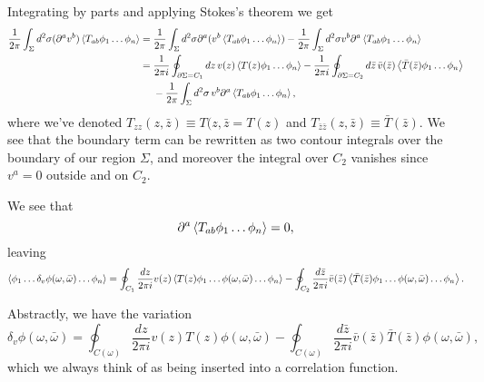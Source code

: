 Integrating by parts and applying Stokes's theorem we get
\begin{align*}
    \frac{1}{2\pi} \int_\Sigma d^2\sigma (\partial^a v^b)\left< T_{ab} \phi_1 \ldots \phi_n \right>
        ={}&\frac{1}{2\pi} \int_\Sigma d^2\sigma \partial^a(v^b \left< T_{ab} \phi_1\ldots \phi_n \right>)-\frac{1}{2\pi}\int_\Sigma d^2\sigma v^b \partial^a \left< T_{ab} \phi_1 \ldots \phi_n \right>\\
        ={}& \frac{1}{2\pi i} \oint_{\partial \Sigma=C_1} dz\, v(z) \left< T(z) \phi_1\ldots \phi_n \right>
        -\frac{1}{2\pi i} \oint_{\partial\Sigma=C_2} d\bar z\, \bar v (\bar z)\left< \bar T(\bar z) \phi_1 \ldots \phi_n \right>\\
        &-\frac{1}{2\pi}\int_\Sigma d^2\sigma \,v^b \partial^a \left< T_{ab}\phi_1 \ldots \phi_n \right>,
\end{align*}
where we've denoted $T_{zz}(z,\bar z)\equiv T(z,\bar z= T(z)$ and $T_{\bar z \bar z}(z,\bar z)\equiv \bar T (\bar z).$ We see that the boundary term can be rewritten as two contour integrals over the boundary of our region $\Sigma$, and moreover the integral over $C_2$ vanishes since $v^a=0$ outside and on $C_2.$

We see that
\begin{equation}
    \partial^a \left< T_{ab}\phi_1 \ldots \phi_n \right>=0,
\end{equation}
leaving
\begin{equation}
    \left< \phi_1 \ldots \delta_v \phi(\omega,\bar \omega)\ldots \phi_n \right> = \oint_{C_1} \frac{dz}{2\pi i} v(z) \left< T(z)\phi_1 \ldots\phi(\omega,\bar \omega)\ldots \phi_n \right>
        -\oint_{C_2} \frac{d\bar z}{2\pi i} \bar v(\bar z) \left< \bar T(\bar z)\phi_1 \ldots\phi(\omega,\bar \omega)\ldots \phi_n \right>.
\end{equation}

Abstractly, we have the variation
\begin{equation}
    \delta_v \phi(\omega, \bar \omega)=\oint_{C(\omega)}\frac{dz}{2\pi i }v(z) T(z) \phi(\omega,\bar \omega)-\oint_{C(\omega)} \frac{d\bar z}{2\pi i} \bar v(\bar z) \bar T (\bar z)\phi(\omega,\bar \omega),
\end{equation}
which we always think of as being inserted into a correlation function.

